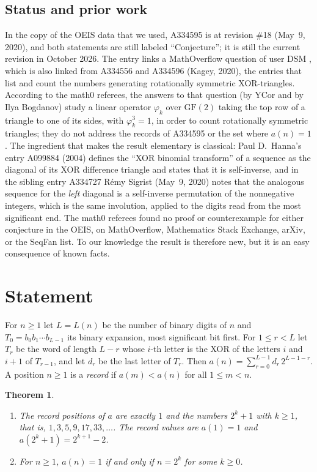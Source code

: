 \documentclass[11pt]{amsart}
\theoremstyle{plain}
\newtheorem{theorem}{Theorem}
\theoremstyle{definition}
\begin{document}
\subsection*{Status and prior work}
In the copy of the OEIS data that we used, A334595 is at revision \#18 (May~9, 2020), and both statements are still labeled ``Conjecture''; it is still the current revision in October 2026.
The entry links a MathOverflow question of user DSM \cite{MO}, which is also linked from A334556 and A334596 \cite{A334556,A334596} (Kagey, 2020), the entries that list and count the numbers generating rotationally symmetric XOR-triangles.
According to the math0 referees, the answers to that question (by YCor and by Ilya Bogdanov) study a linear operator $\varphi_k$ over $\mathrm{GF}(2)$ taking the top row of a triangle to one of its sides, with $\varphi_k^3=1$, in order to count rotationally symmetric triangles; they do not address the records of A334595 or the set where $a(n)=1$.
The ingredient that makes the result elementary is classical: Paul D.~Hanna's entry A099884 \cite{A099884} (2004) defines the ``XOR binomial transform'' of a sequence as the diagonal of its XOR difference triangle and states that it is self-inverse, and in the sibling entry A334727 \cite{A334727} Rémy Sigrist (May~9, 2020) notes that the analogous sequence for the \emph{left} diagonal is a self-inverse permutation of the nonnegative integers, which is the same involution, applied to the digits read from the most significant end.
The math0 referees found no proof or counterexample for either conjecture in the OEIS, on MathOverflow, Mathematics Stack Exchange, arXiv, or the SeqFan list. To our knowledge the result is therefore new, but it is an easy consequence of known facts.

\section{Statement}\label{sec:statement}

For $n\ge1$ let $L=L(n)$ be the number of binary digits of $n$ and $T_0=b_0b_1\cdots b_{L-1}$ its binary expansion, most significant bit first. For $1\le r<L$ let $T_r$ be the word of length $L-r$ whose $i$-th letter is the XOR of the letters $i$ and $i+1$ of $T_{r-1}$, and let $d_r$ be the last letter of $T_r$. Then $a(n)=\sum_{r=0}^{L-1} d_r\,2^{L-1-r}$.
A position $n\ge1$ is a \emph{record} if $a(m)<a(n)$ for all $1\le m<n$.

\begin{theorem}\label{thm:main}
\begin{enumerate}
\item[(a)] The record positions of $a$ are exactly $1$ and the numbers $2^k+1$ with $k\ge1$, that is, $1,3,5,9,17,33,\dots$. The record values are $a(1)=1$ and $a(2^k+1)=2^{k+1}-2$.
\item[(b)] For $n\ge1$, $a(n)=1$ if and only if $n=2^k$ for some $k\ge0$.
\end{enumerate}
\end{theorem}
\end{document}
